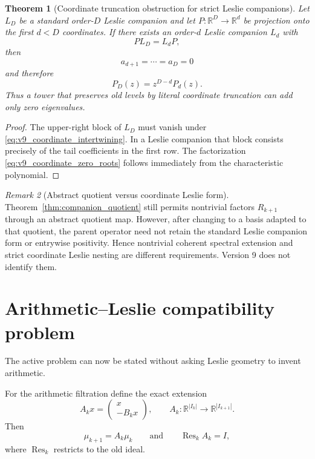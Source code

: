 \documentclass[11pt]{amsart}
\numberwithin{equation}{section}
\theoremstyle{plain}
\newtheorem{theorem}{Theorem}[section]
\theoremstyle{definition}
\theoremstyle{remark}
\newtheorem{remark}[theorem]{Remark}
\begin{document}
\begin{theorem}[Coordinate truncation obstruction for strict Leslie companions]
\label{thm:v9_coordinate_projection_obstruction}
Let $L_D$ be a standard order-$D$ Leslie companion and let
$P:\mathbb R^D\to\mathbb R^d$ be projection onto the first $d<D$ coordinates.  If there exists
an order-$d$ Leslie companion $L_d$ with
\begin{equation}
PL_D=L_dP,
\label{eq:v9_coordinate_intertwining}
\end{equation}
then
\[
a_{d+1}=\cdots=a_D=0
\]
and therefore
\begin{equation}
\boxed{P_D(z)=z^{D-d}P_d(z).}
\label{eq:v9_coordinate_zero_roots}
\end{equation}
Thus a tower that preserves old levels by literal coordinate truncation can add only zero
eigenvalues.
\end{theorem}

\begin{proof}
The upper-right block of $L_D$ must vanish under \eqref{eq:v9_coordinate_intertwining}.  In a
Leslie companion that block consists precisely of the tail coefficients in the first row.  The
factorization \eqref{eq:v9_coordinate_zero_roots} follows immediately from the characteristic
polynomial.
\end{proof}

\begin{remark}[Abstract quotient versus coordinate Leslie form]
\label{rem:v9_abstract_vs_coordinate_tower}
Theorem~\ref{thm:companion_quotient} still permits nontrivial factors $R_{k+1}$ through an
abstract quotient map.  However, after changing to a basis adapted to that quotient, the parent
operator need not retain the standard Leslie companion form or entrywise positivity.  Hence
nontrivial coherent spectral extension and strict coordinate Leslie nesting are different
requirements.  Version 9 does not identify them.
\end{remark}

\section{Arithmetic--Leslie compatibility problem}
\label{sec:arithmetic_leslie_compatibility}

The active problem can now be stated without asking Leslie geometry to invent arithmetic.

For the arithmetic filtration define the exact extension
\begin{equation}
A_kx=
\begin{pmatrix}
x\\
-B_kx
\end{pmatrix},
\qquad
A_k:\mathbb R^{|I_k|}\to\mathbb R^{|I_{k+1}|}.
\label{eq:arithmetic_extension_operator}
\end{equation}
Then
\[
\mu_{k+1}=A_k\mu_k
\qquad\text{and}\qquad
\operatorname{Res}_kA_k=I,
\]
where $\operatorname{Res}_k$ restricts to the old ideal.
\end{document}
